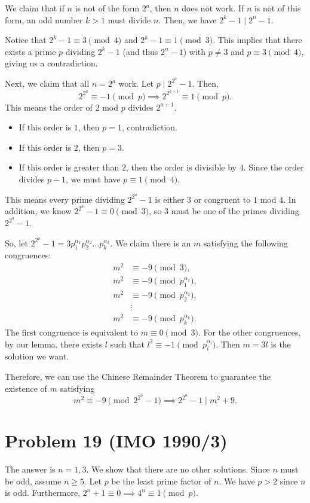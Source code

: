 \documentclass{scrartcl}
\begin{document}
We claim that if $n$ is not of the form $2^a$, then $n$ does not work.
If $n$ is not of this form, an odd number $k > 1$ must divide $n$.
Then, we have $2^k - 1 \mid 2^n - 1$.

Notice that $2^k - 1 \equiv 3 \pmod{4}$ and $2^k - 1 \equiv 1 \pmod{3}$.
This implies that there exists a prime $p$ dividing $2^k - 1$ (and thus $2^n - 1$) with $p \neq 3$ and $p \equiv 3 \pmod{4}$, giving us a contradiction.

Next, we claim that all $n = 2^a$ work. Let $p \mid 2^{2^a} - 1$. Then,
\[ 2^{2^a} \equiv -1 \pmod{p} \implies 2^{2^{a+1}} \equiv 1 \pmod{p}. \]
This means the order of $2$ mod $p$ divides $2^{a+1}$.

\begin{itemize}
    \item If this order is $1$, then $p = 1$, contradiction.
    \item If this order is $2$, then $p = 3$.
    \item If this order is greater than $2$, then the order is divisible by $4$.
    Since the order divides $p-1$, we must have $p \equiv 1\pmod{4}$.
\end{itemize}

This means every prime dividing $2^{2^a} - 1$ is either $3$ or congruent to $1$ mod $4$.
In addition, we know $2^{2^a} - 1 \equiv 0 \pmod{3}$, so $3$ must be one of the primes dividing $2^{2^a} - 1$.

So, let $2^{2^a} - 1 = 3p_1^{\alpha_1}p_2^{\alpha_2}\ldots p_k^{\alpha_k}$. We claim there is an $m$ satisfying the following congruences:
\begin{align*}
    m^2 &\equiv -9 \pmod{3}, \\
    m^2 &\equiv -9 \pmod{p_1^{\alpha_1}}, \\
    m^2 &\equiv -9 \pmod{p_2^{\alpha_2}}, \\
    &\vdots \\
    m^2 &\equiv -9 \pmod{p_k^{\alpha_k}}.
\end{align*}
The first congruence is equivalent to $m \equiv 0 \pmod{3}$.
For the other congruences, by our lemma, there exists $l$ such that $l^2 \equiv -1 \pmod{p_i^{\alpha_i}}$.
Then $m = 3l$ is the solution we want.

Therefore, we can use the Chinese Remainder Theorem to guarantee the existence of $m$ satisfying
\[ m^2 \equiv -9 \pmod{2^{2^a} - 1} \implies 2^{2^a} - 1 \mid m^2 + 9. \]

\section*{Problem 19 (IMO 1990/3)}
The answer is $n=1,3$. We show that there are no other solutions. Since $n$ must be odd, assume $n \geq 5$.
Let $p$ be the least prime factor of $n$. We have $p > 2$ since $n$ is odd. Furthermore, $2^n + 1 \equiv 0 \implies 4^n \equiv 1 \pmod{p}$.
\end{document}
